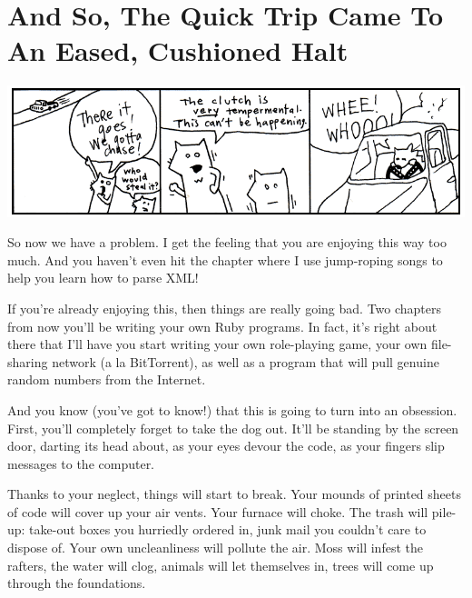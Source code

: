 \documentclass[10pt,twoside]{report}
\begin{document}
\section{And So, The Quick Trip Came To An Eased, Cushioned Halt}


	\includegraphics[width=1.0\textwidth]{cache/18.png}

So now we have a problem.  I get the feeling that you are enjoying
this way too much. And you haven't even hit the chapter where I use
jump-roping songs to help you learn how to parse XML!

If you're already enjoying this, then things are really going bad.
Two chapters from now you'll be writing your own Ruby programs.  In
fact, it's right about there that I'll have you start writing your own
role-playing game, your own file-sharing network (a la BitTorrent), as
well as a program that will pull genuine random numbers from the
Internet.


And you know (you've got to know!) that this is going to turn into an
obsession.  First, you'll completely forget to take the dog out.
It'll be standing by the screen door, darting its head about, as your
eyes devour the code, as your fingers slip messages to the computer.

Thanks to your neglect, things will start to break.  Your mounds of
printed sheets of code will cover up your air vents.  Your furnace
will choke.  The trash will pile-up: take-out boxes you hurriedly
ordered in, junk mail you couldn't care to dispose of.  Your own
uncleanliness will pollute the air.  Moss will infest the rafters, the
water will clog, animals will let themselves in, trees will come up
through the foundations.
\end{document}
